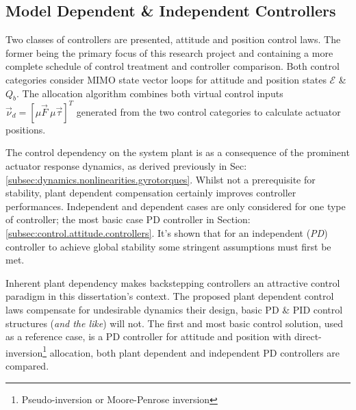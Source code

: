 \subsection*{Model Dependent \& Independent Controllers}
Two classes of controllers are presented, attitude and position control laws. The former being the primary focus of this research project and containing a more complete schedule of control treatment and controller comparison. Both control categories consider MIMO state vector loops for attitude and position states $\mathcal{E}$ \& $Q_b$. The allocation algorithm combines both virtual control inputs $\vec{\nu}_d=[\mu\vec{F}~\mu\vec{\tau}]^T$ generated from the two control categories to calculate actuator positions.
\par
The control dependency on the system plant is as a consequence of the prominent actuator response dynamics, as derived previously in Sec:\ref{subsec:dynamics.nonlinearities.gyrotorques}. Whilst not a prerequisite for stability, plant dependent compensation certainly improves controller performances. Independent and dependent cases are only considered for one type of controller; the most basic case PD controller in Section:\ref{subsec:control.attitude.controllers}. It's shown that for an independent (\emph{PD}) controller to achieve global stability some stringent assumptions must first be met.
\par
Inherent plant dependency makes backstepping controllers an attractive control paradigm in this dissertation's context. The proposed plant dependent control laws compensate for undesirable dynamics their design, basic PD \& PID control structures (\emph{and the like}) will not. The first and most basic control solution, used as a reference case, is a PD controller for attitude and position with direct-inversion\footnote{Pseudo-inversion or Moore-Penrose inversion} allocation, both plant dependent and independent PD controllers are compared.
